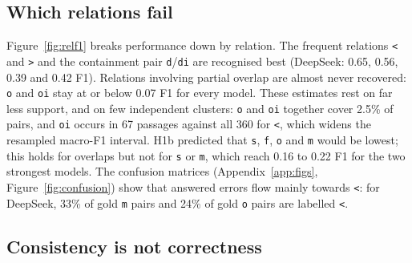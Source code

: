 \documentclass[11pt]{article}
\newcommand{\rel}[1]{\texttt{#1}}
\newcommand{\Ds}{DeepSeek}
\begin{document}
\subsection{Which relations fail}
\label{sec:relations}

Figure~\ref{fig:relf1} breaks performance down by relation. The frequent relations \rel{<} and \rel{>} and the containment pair \rel{d}/\rel{di} are recognised best (\Ds: 0.65, 0.56, 0.39 and 0.42 F1). Relations involving partial overlap are almost never recovered: \rel{o} and \rel{oi} stay at or below 0.07 F1 for every model. These estimates rest on far less support, and on few independent clusters: \rel{o} and \rel{oi} together cover 2.5\% of pairs, and \rel{oi} occurs in 67 passages against all 360 for \rel{<}, which widens the resampled macro-F1 interval. H1b predicted that \rel{s}, \rel{f}, \rel{o} and \rel{m} would be lowest; this holds for overlaps but not for \rel{s} or \rel{m}, which reach 0.16 to 0.22 F1 for the two strongest models. The confusion matrices (Appendix~\ref{app:figs}, Figure~\ref{fig:confusion}) show that answered errors flow mainly towards \rel{<}: for \Ds, 33\% of gold \rel{m} pairs and 24\% of gold \rel{o} pairs are labelled \rel{<}.

\subsection{Consistency is not correctness}
\label{sec:consistency}
\end{document}
